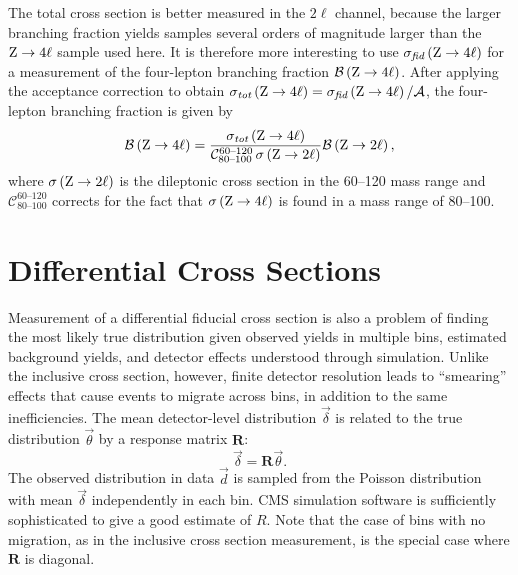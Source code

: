 The total {\PZ} cross section is better measured in the $2\ell$ channel, because the larger branching fraction yields samples several orders of magnitude larger than the $\mathrm{Z} \to 4\ell$ sample used here.
It is therefore more interesting to use $\sigma_\textit{fid}\left(\mathrm{Z} \to 4\ell\right)$ for a measurement of the four-lepton branching fraction $\mathcal{B}\left(\mathrm{Z} \to 4\ell\right)$.
After applying the acceptance correction to obtain $\sigma_\textit{tot} \left(\mathrm{Z} \to 4\ell\right) = \sigma_\textit{fid}\left(\mathrm{Z} \to 4\ell\right) / \mathcal{A}$, the four-lepton branching fraction is given by
\begin{equation}
  \mathcal{B}\left(\mathrm{Z} \to 4\ell\right) = \frac{\sigma_\textit{tot} \left(\mathrm{Z} \to 4\ell\right)} {\mathcal{C}^{\text{60--120}}_{\text{80--100}} \, \sigma \left(\mathrm{Z} \to 2\ell\right)}\mathcal{B}\left(\mathrm{Z} \to 2\ell\right),
\end{equation}
where $\sigma \left(\mathrm{Z} \to 2\ell\right)$ is the dileptonic {\PZ} cross section in the {60--120\GeV} mass range and $\mathcal{C}^{\text{60--120}}_{\text{80--100}}$ corrects for the fact that $\sigma\left(\mathrm{Z} \to 4\ell\right)$ is found in a mass range of {80--100\GeV}.



\section{Differential Cross Sections}

Measurement of a differential fiducial cross section is also a problem of finding the most likely true distribution given observed yields in multiple bins, estimated background yields, and detector effects understood through simulation.
Unlike the inclusive cross section, however, finite detector resolution leads to ``smearing'' effects that cause events to migrate across bins, in addition to the same inefficiencies.
The mean detector-level distribution $\vec{\delta}$ is related to the true distribution $\vec{\theta}$ by a response matrix $\mathbf{R}$:
\begin{equation}
  \vec{\delta} = \mathbf{R}\vec{\theta}.
\end{equation}
The observed distribution in data $\vec{d}$ is sampled from the Poisson distribution with mean $\vec{\delta}$ independently in each bin.
CMS simulation software is sufficiently sophisticated to give a good estimate of $R$.
Note that the case of bins with no migration, as in the inclusive cross section measurement, is the special case where $\mathbf{R}$ is diagonal.

